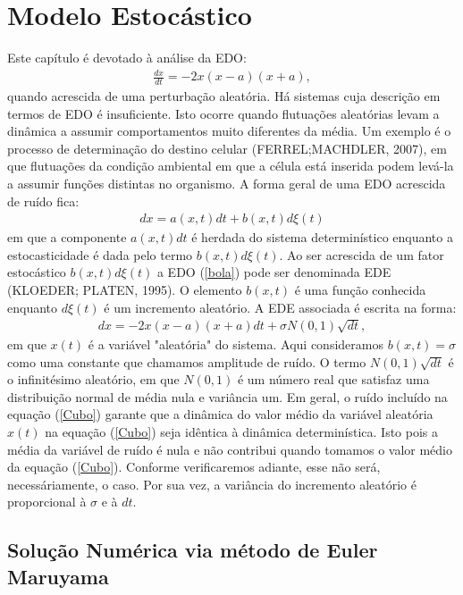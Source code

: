 \chapter*{Modelo Estocástico}

Este capítulo é devotado à análise da EDO:
\begin{eqnarray} \label{bola}
\frac{dx}{dt} = -2x(x-a)(x+a) ,
\end{eqnarray}
quando acrescida de uma perturbação aleatória. Há sistemas cuja descrição em termos de EDO é insuficiente. Isto ocorre quando flutuações aleatórias levam a dinâmica a assumir comportamentos muito diferentes da média. Um exemplo é o processo de determinação do destino celular (FERREL;MACHDLER, 2007), em que flutuações da condição ambiental em que a célula está inserida podem levá-la a assumir funções distintas no organismo.
A forma geral de uma EDO acrescida de ruído fica:
\begin{eqnarray}\label{triangulo}
dx = a(x,t)dt + b(x,t) d\xi(t)
\end{eqnarray}
em que a componente $a(x,t)dt$ é herdada do sistema determinístico enquanto a estocasticidade é dada pelo termo $b(x,t)d\xi(t)$. Ao ser acrescida de um fator estocástico $b(x,t)d\xi(t)$ a EDO (\ref{bola}) pode ser denominada EDE (KLOEDER; PLATEN, 1995). O elemento $b(x,t)$ é uma função conhecida enquanto $d\xi(t)$ é um incremento aleatório. A EDE associada é escrita na forma:
\begin{eqnarray}\label{Cubo}
{dx} = -2x(x-a)(x+a)dt + \sigma N(0,1) \sqrt{dt} ,
\end{eqnarray}
em que $x(t)$ é a variável "aleatória" do sistema. Aqui consideramos $b(x,t) = \sigma $ como uma constante que chamamos amplitude de ruído. O termo $N(0,1) \sqrt{dt}$ é o infinitésimo aleatório, em que $N(0,1)$ é um número real que satisfaz uma distribuição normal de média nula e variância um.
Em geral, o ruído incluído na equação (\ref{Cubo}) garante que a dinâmica do valor médio da variável aleatória $x(t)$ na equação (\ref{Cubo}) seja idêntica à dinâmica determinística. Isto pois a média da variável de ruído é nula e não contribui quando tomamos o valor médio da equação (\ref{Cubo}). Conforme verificaremos adiante, esse não será, necessáriamente, o caso. Por sua vez, a variância do incremento aleatório é proporcional à ${\sigma}$ e à $dt$.

\section{Solução Numérica via método de Euler Maruyama}

